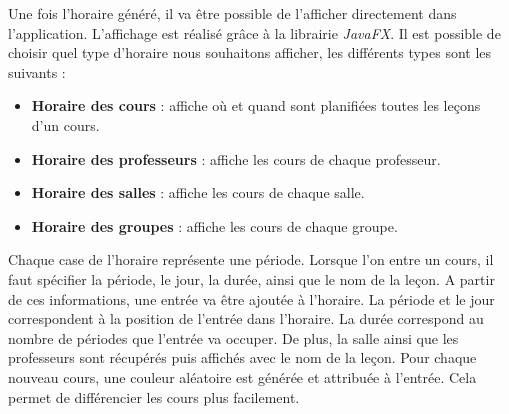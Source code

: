 Une fois l'horaire généré, il va être possible de l'afficher directement dans l'application. L'affichage est réalisé grâce à la librairie \textit{JavaFX}. Il est possible de choisir quel type d'horaire nous souhaitons afficher, les différents types sont les suivants :

\begin{itemize}
    \item \textbf{Horaire des cours} : affiche où et quand sont planifiées toutes les leçons d'un cours.
    \item \textbf{Horaire des professeurs} : affiche les cours de chaque professeur.
    \item \textbf{Horaire des salles} : affiche les cours de chaque salle.
    \item \textbf{Horaire des groupes} : affiche les cours de chaque groupe.
\end{itemize}

\vspace{\baselineskip}

Chaque case de l'horaire représente une période. Lorsque l'on entre un cours, il faut spécifier la période, le jour, la durée, ainsi que le nom de la leçon. A partir de ces informations, une entrée va être ajoutée à l'horaire. La période et le jour correspondent à la position de l'entrée dans l'horaire. La durée correspond au nombre de périodes que l'entrée va occuper. De plus, la salle ainsi que les professeurs sont récupérés puis affichés avec le nom de la leçon. Pour chaque nouveau cours, une couleur aléatoire est générée et attribuée à l'entrée. Cela permet de différencier les cours plus facilement.